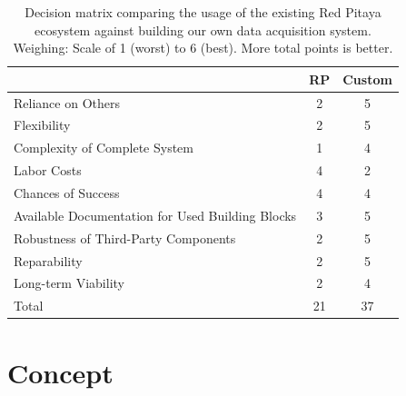 \begin{table}
    \centering
    \caption[Decision Matrix of Possible System Design Choices]{%
        Decision   matrix   comparing   the   usage  of   the   existing   Red
        Pitaya   ecosystem  against   building   our   own  data   acquisition
        system. Weighing: Scale  of \num{1}  (worst)  to \num{6}  (best). More
        total points is better.%
    }
    \label{tab:decision_matrix:pitaya_vs_own}
    \begin{tabular}{>{\raggedright}p{80mm}SS}
        \toprule
        & RP & Custom \\
        \midrule
        Reliance on Others &
        2 & 5 \\

        Flexibility &
        2 & 5 \\

        Complexity of Complete System &
        1 & 4 \\

        Labor Costs &
        4 & 2 \\

        Chances of Success &
        4 & 4 \\

        Available Documentation for Used Building Blocks &
        3 & 5 \\

        Robustness of Third-Party Components &
        2 & 5 \\

        Reparability &
        2 & 5 \\

        Long-term Viability&
        2 & 4 \\
        \midrule
        Total & 21 & 37 \\
        \bottomrule
    \end{tabular}
\end{table}

%
%
\section{Concept} %
\label{sec:mission:concept}

